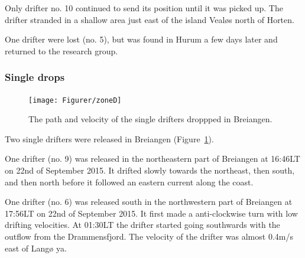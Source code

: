 \documentclass[12pt,a4paper,english]{article}
\begin{document}
Only drifter no. 10 continued to send its position until it was picked up. The drifter stranded in a shallow area just east of the island Veal{\o}s north of Horten.

One drifter were lost (no. 5), but was found in Hurum a few days later and returned to the research group.

\subsubsection{Single drops}
%
\begin{figure}[ht]
\centerline{
\texttt{[image: Figurer/zoneD]}}
\caption{\small
The path and velocity of the single drifters droppped in Breiangen.}
\label{fig:ZoneD}
\end{figure}
%
%
Two single drifters were released in Breiangen (Figure~\ref{fig:ZoneD}).

One drifter (no. 9) was released in the northeastern part of Breiangen at 16:46LT on 22nd of September 2015. It drifted slowly towards the northeast, then south, and then north before it followed an eastern current along the coast. %

One drifter (no. 6) was released south in the northwestern part of Breiangen at 17:56LT on 22nd of September 2015. It first made a anti-clockwise turn with low drifting velocities. %
At 01:30LT the drifter started going southwards with the outflow from the Drammensfjord. The velocity of the drifter was almost 0.4m/s east of Lang{\o} ya. %
\end{document}
